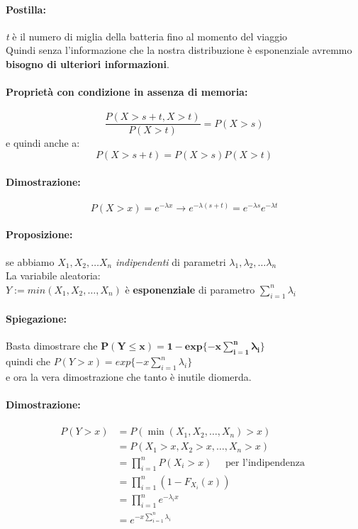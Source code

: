 \documentclass[]{article}
\begin{document}
    \paragraph{Postilla:} \textit{t} è il numero di miglia della batteria fino al momento del viaggio \\
    Quindi senza l'informazione che la nostra distribuzione è esponenziale avremmo \textbf{bisogno di ulteriori informazioni}.


    \paragraph{Proprietà con condizione in assenza di memoria:}
    \[ \frac{P(X > s + t, X > t)}{P(X > t)} = P(X > s) \]
    e quindi anche a:
    \[ P(X > s + t) = P(X > s) P(X > t) \]
    \paragraph{Dimostrazione:}
    \[ P(X > x) = e^{-\lambda x} \rightarrow e^{-\lambda(s+t)} = e^{-\lambda s} e^{-\lambda t} \]

    \paragraph{Proposizione:} se abbiamo $X_1, X_2, \ldots X_n$ \textit{indipendenti} di parametri $\lambda_1, \lambda_2, \ldots \lambda_n$ \\
    La variabile aleatoria: \\
    $Y := min(X_1, X_2, \ldots, X_n)$ è \textbf{esponenziale} di parametro $\sum_{i = 1}^{n} \lambda_i$ \\
    \paragraph{Spiegazione:} Basta dimostrare che $\boldsymbol{P(Y \leq x) = 1 - exp\{-x \sum_{i = 1}^{n} \lambda_i \}}$ \\
    quindi che $P(Y > x) = exp\{-x \sum_{i = 1}^{n} \lambda_i \}$ \\ 
    e ora la vera dimostrazione che tanto è inutile diomerda.

    \paragraph{Dimostrazione:}
    \begin{equation}
        \begin{aligned}
            P(Y>x) & =P\left(\min \left(X_1, X_2, \ldots, X_n\right)>x\right) \\
            & =P\left(X_1>x, X_2>x, \ldots, X_n>x\right) \\
            & =\prod_{i=1}^n P\left(X_i>x\right) \quad \text { per l'indipendenza } \\
            & =\prod_{i=1}^n\left(1-F_{X_i}(x)\right) \\
            & =\prod_{i=1}^n e^{-\lambda_i x} \\
            & =e^{-x \sum_{i=1}^n \lambda_i}
        \end{aligned}
    \end{equation}
    \newpage
\end{document}
